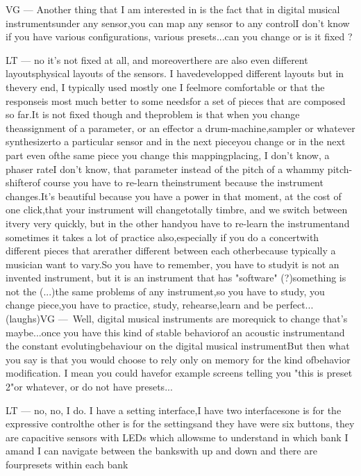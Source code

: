 VG — Another thing that I am interested in is the fact that in digital musical instrumentsunder any sensor,you can map any sensor to any controlI don't know if you have various configurations, various presets...can you change or is it fixed ?

LT — no it's not fixed at all, and moreoverthere are also even different layoutsphysical layouts of the sensors. I havedevelopped different layouts but in thevery end, I typically used mostly one I feelmore comfortable or that the responseis most much better to some needsfor a set of pieces that are composed so far.It is not fixed though and theproblem is that when you change theassignment of a parameter, or an effector a drum-machine,sampler or whatever synthesizerto a particular sensor and in the next pieceyou change or in the next part even ofthe same piece you change this mappingplacing, I don't know, a phaser rateI don't know, that parameter instead of the pitch of a whammy pitch-shifterof course you have to re-learn theinstrument because the instrument changes.It's beautiful because you have a power in that moment, at the cost of one click,that your instrument will changetotally timbre, and we switch between itvery very quickly, but in the other handyou have to re-learn the instrumentand sometimes it takes a lot of practice also,especially if you do a concertwith different pieces that arerather different between each otherbecause typically a musician want to vary.So you have to remember, you have to studyit is not an invented instrument, but it is an instrument that has "software" (?)something is not the (...)the same problems of any instrument,so you have to study, you change piece,you have to practice, study, rehearse,learn and be perfect... (laughs)VG — Well, digital musical instruments are morequick to change that's maybe...once you have this kind of stable behaviorof an acoustic instrumentand the constant evolutingbehaviour on the digital musical instrumentBut then what you say is that you would choose to rely only on memory for the kind ofbehavior modification. I mean you could havefor example screens telling you "this is preset 2"or whatever, or do not have presets...

LT — no, no, I do. I have a setting interface,I have two interfacesone is for the expressive controlthe other is for the settingsand they have were six buttons, they are capacitive sensors with LEDs which allowsme to understand in which bank I amand I can navigate between the bankswith up and down and there are fourpresets within each bank

